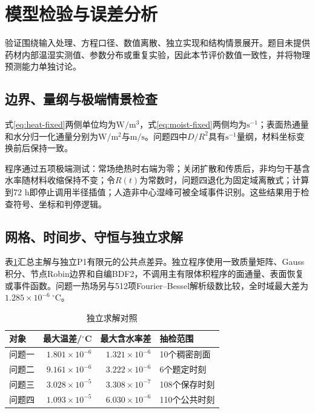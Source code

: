 \section{模型检验与误差分析}

验证围绕输入处理、方程口径、数值离散、独立实现和结构情景展开。题目未提供药材内部温湿实测值、参数分布或重复实验，因此本节评价数值一致性，并将物理预测能力单独讨论。

\subsection{边界、量纲与极端情景检查}

式\eqref{eq:heat-fixed}两侧单位均为$\mathrm{W/m^3}$，式\eqref{eq:moist-fixed}两侧均为$\mathrm{s^{-1}}$；表面热通量和水分归一化通量分别为$\mathrm{W/m^2}$与$\mathrm{m/s}$。问题四中$D/R^2$具有$\mathrm{s^{-1}}$量纲，材料坐标变换前后保持一致。

程序通过五项极端测试：常场绝热时右端为零；关闭扩散和传质后，非均匀干基含水率随材料收缩保持不变；令$R(t)$为常数时，问题四退化为固定域离散式；计算到72 h即停止调用半径插值；人造非中心湿峰可被全域事件识别。这些结果用于检查符号、坐标和判停逻辑。

\subsection{网格、时间步、守恒与独立求解}

表\ref{tab:verification-summary}汇总主解与独立P1有限元的公共点差异。独立程序使用一致质量矩阵、Gauss积分、节点Robin边界和自编BDF2，不调用主有限体积程序的面通量、表面恢复或事件函数。问题一热场另与512项Fourier--Bessel解析级数比较，全时域最大差为$1.285\times10^{-6}\ ^\circ\mathrm C$。

\begin{table}[htbp]
  \caption{独立求解对照}
  \label{tab:verification-summary}
  \centering
  \begin{tabular}{lrrl}
    \toprule
    对象 & 最大温差/$^\circ$C & 最大含水率差 & 抽检范围 \\
    \midrule
    问题一 & $1.801\times10^{-6}$ & $1.321\times10^{-6}$ & 10个稠密剖面 \\
    问题二 & $9.161\times10^{-6}$ & $3.222\times10^{-6}$ & 6个题定时刻 \\
    问题三 & $3.028\times10^{-5}$ & $3.308\times10^{-7}$ & 108个保存时刻 \\
    问题四 & $1.093\times10^{-5}$ & $6.030\times10^{-6}$ & 110个公共时刻 \\
    \bottomrule
  \end{tabular}
\end{table}

